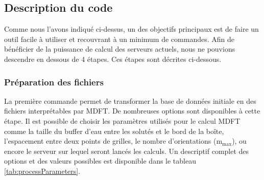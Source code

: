 \subsection{Description du code}
Comme nous l'avons indiqué ci-dessus, un des objectifs principaux est de faire un outil facile à utiliser et recouvrant à un minimum de commandes. Afin de bénéficier de la puissance de calcul des serveurs actuels, nous ne pouvions descendre en dessous de 4 étapes. Ces étapes sont décrites ci-dessous.

\subsubsection{Préparation des fichiers}
La première commande permet de transformer la base de données initiale en des fichiers interprétables par MDFT. De nombreuses options sont disponibles à cette étape. Il est possible de choisir les paramètres utilisés pour le calcul MDFT comme la taille du buffer d'eau entre les solutés et le bord de la boîte, l'espacement entre deux points de grilles, le nombre d'orientations ($\mathrm{m}_\mathrm{max}$), ou encore le serveur sur lequel seront lancés les calculs. Un descriptif complet des options et des valeurs possibles est disponible dans le tableau \ref{tab:processParameters}.


